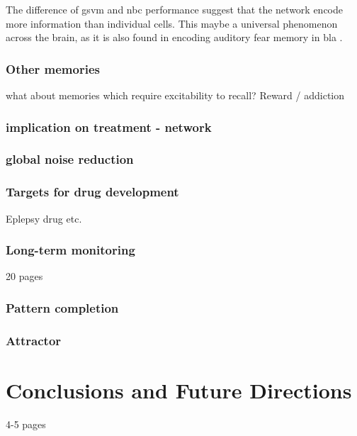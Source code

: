 The difference of \gls{gsvm} and \gls{nbc} performance suggest that the network encode more information than individual cells. This maybe a universal phenomenon across the brain, as it is also found in encoding auditory fear memory in \gls{bla} . 

\subsection{Other memories}
what about memories which require excitability to recall?
Reward / addiction

\subsection{implication on treatment - network}
\subsection{global noise reduction}
\subsection{Targets for drug development}
Eplepsy drug etc.
\subsection{Long-term monitoring}

20 pages

\subsection{Pattern completion}
\subsection{Attractor}
\chapter{Conclusions and Future Directions}
4-5 pages
